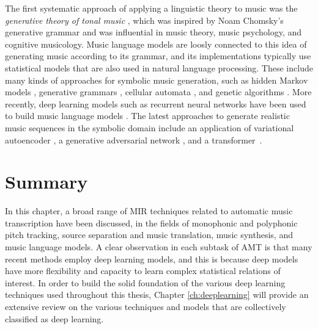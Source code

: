 The first systematic approach of applying a linguistic theory to music was the \emph{generative theory of tonal music} \cite{lerdahl1983gttm}, which was inspired by Noam Chomsky's generative grammar \cite{chomsky1966generative} and was influential in music theory, music psychology, and cognitive musicology.
Music language models are loosly connected to this idea of generating music according to its grammar, and its implementations typically use statistical models that are also used in natural language processing.
These include many kinds of approaches for symbolic music generation, such as hidden Markov models \cite{farbood2001markov}, generative grammars \cite{chemilier2001grammar}, cellular automata \cite{burraston2004automata}, and genetic algorithms \cite{miranda2007evolutionary}.
More recently, deep learning models such as recurrent neural networks have been used to build music language models \cite{sigtia2014lm}.
The latest approaches to generate realistic music sequences in the symbolic domain include an application of variational autoencoder \cite{teng2017generating,tikhonov2017generation}, a generative adversarial network \cite{yang2017midinet}, and a transformer~\cite{huang2019transformer}.

\section{Summary}

In this chapter, a broad range of MIR techniques related to automatic music transcription have been discussed, in the fields of monophonic and polyphonic pitch tracking, source separation and music translation, music synthesis, and music language models.
A clear observation in each subtask of AMT is that many recent methods employ deep learning models, and this is because deep models have more flexibility and capacity to learn complex statistical relations of interest.
In order to build the solid foundation of the various deep learning techniques used throughout this thesis, Chapter \ref{ch:deeplearning} will provide an extensive review on the various techniques and models that are collectively classified as deep learning.

